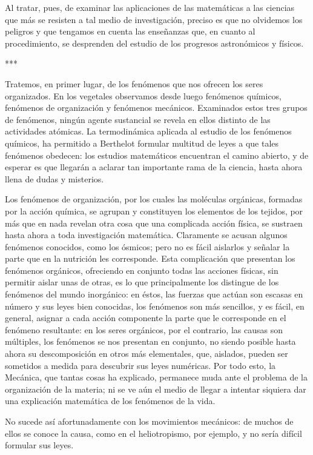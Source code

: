 \documentclass[a4paper, 12pt]{article}
\begin{document}
Al tratar, pues, de examinar las aplicaciones de las matemáticas a las ciencias que más se resisten a tal medio de investigación, preciso es que no olvidemos los peligros y que 
tengamos en cuenta las enseñanzas que, en cuanto al procedimiento, se desprenden del estudio de los progresos astronómicos y físicos.

\bigskip


\centerline{***}

Tratemos, en primer lugar, de los fenómenos que nos ofrecen los seres organizados. En los vegetales observamos desde luego fenómenos químicos, fenómenos de organización y fenómenos mecánicos. Examinados estos tres grupos de fenómenos, ningún agente sustancial se revela en ellos distinto de las actividades atómicas. La termodinámica aplicada al estudio de los fenómenos químicos, ha permitido a Berthelot formular multitud de leyes a que tales fenómenos obedecen: los estudios matemáticos encuentran el camino abierto, y de esperar es que llegarán a aclarar tan importante rama de la ciencia, hasta ahora llena de dudas y misterios.

Los fenómenos de organización, por los cuales las moléculas orgánicas, formadas por la acción química, se agrupan y constituyen los elementos de los tejidos, por más que en nada revelan otra cosa que una complicada acción física, se sustraen hasta ahora a toda investigación matemática. Claramente se acusan algunos fenómenos conocidos, como los ósmicos; pero no es fácil aislarlos y señalar la parte que en la nutrición les corresponde. Esta complicación que presentan los fenómenos orgánicos, ofreciendo en conjunto todas las acciones físicas, sin permitir aislar unas de otras, es lo que principalmente los distingue de los fenómenos del mundo inorgánico: en éstos, las fuerzas que actúan son escasas en número y sus leyes bien conocidas, los fenómenos son más sencillos, y es fácil, en general, asignar a cada acción componente la parte que le corresponde en el fenómeno resultante: en los seres orgánicos, por el contrario, las causas son múltiples, los fenómenos se nos presentan en conjunto, no siendo posible hasta ahora su descomposición en otros más elementales, que, aislados, pueden ser sometidos a medida para descubrir sus leyes numéricas. Por todo esto, la Mecánica, que tantas cosas ha explicado, permanece muda ante el problema de la organización de la materia; ni se ve aún el medio de llegar a intentar siquiera dar una explicación matemática de los fenómenos de la vida.

No sucede así afortunadamente con los movimientos mecánicos: de muchos de ellos se conoce la causa, como en el heliotropismo, por ejemplo, y no sería difícil formular sus leyes.
\end{document}
